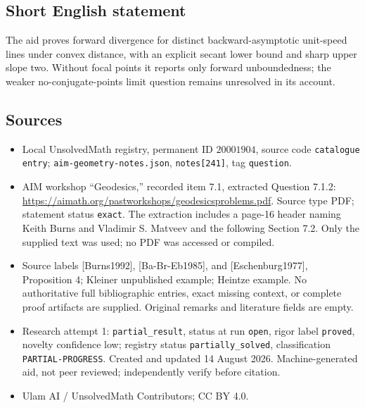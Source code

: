\documentclass[11pt]{article}
\begin{document}
\subsection{Short English statement}
The aid proves forward divergence for distinct backward-asymptotic unit-speed lines under convex distance, with an explicit secant lower bound and sharp upper slope two. Without focal points it reports only forward unboundedness; the weaker no-conjugate-points limit question remains unresolved in its account.
\subsection{Sources}
\begin{itemize}
\item Local UnsolvedMath registry, permanent ID \(20001904\), source code \texttt{catalogue entry}; \texttt{aim-geometry-notes.json}, \texttt{notes[241]}, tag \texttt{question}.
\item AIM workshop ``Geodesics,'' recorded item 7.1, extracted Question 7.1.2: \url{https://aimath.org/pastworkshops/geodesicsproblems.pdf}. Source type PDF; statement status \texttt{exact}. The extraction includes a page-16 header naming Keith Burns and Vladimir S. Matveev and the following Section 7.2. Only the supplied text was used; no PDF was accessed or compiled.
\item Source labels [Burns1992], [Ba-Br-Eb1985], and [Eschenburg1977], Proposition 4; Kleiner unpublished example; Heintze example. No authoritative full bibliographic entries, exact missing context, or complete proof artifacts are supplied. Original remarks and literature fields are empty.
\item Research attempt 1: \texttt{partial\_result}, status at run \texttt{open}, rigor label \texttt{proved}, novelty confidence low; registry status \texttt{partially\_solved}, classification \texttt{PARTIAL-PROGRESS}. Created and updated 14 August 2026. Machine-generated aid, not peer reviewed; independently verify before citation.
\item Ulam AI / UnsolvedMath Contributors; CC BY 4.0.
\end{itemize}
\end{document}
